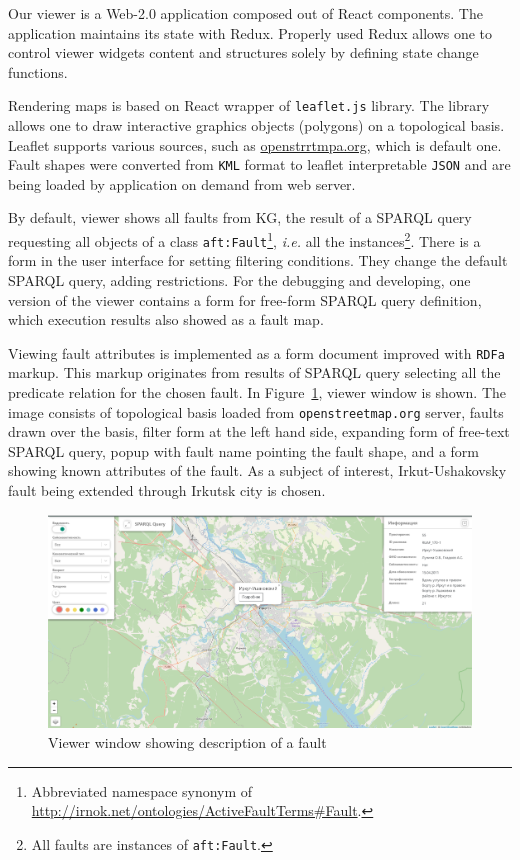 \documentclass[
]{ceurart}
\begin{document}
Our viewer is a Web-2.0 application composed out of React components.  The application maintains its state with Redux. Properly used Redux allows one to control viewer widgets content and structures solely by defining state change functions.

Rendering maps is based on React wrapper of \texttt{leaflet.js} library.  The library allows one to draw interactive graphics objects (polygons) on a topological basis.  Leaflet supports various sources, such as \href{https://openstreetmap.org/}{openstrrtmpa.org}, which is default one.  Fault shapes were converted from \texttt{KML} format to leaflet interpretable \texttt{JSON} and are being loaded by application on demand from web server.

By default, viewer shows all faults from KG, the result of a SPARQL query requesting all objects of a class \texttt{aft:Fault}\footnote{Abbreviated namespace synonym of \url{http://irnok.net/ontologies/ActiveFaultTerms\#Fault}.}, \emph{i.e.} all the instances\footnote{All faults are instances of \texttt{aft:Fault}.}.  There is a form in the user interface for setting filtering conditions.  They change the default SPARQL query, adding restrictions.  For the debugging and developing, one version of the viewer contains a form for free-form SPARQL query definition, which execution results also showed as a fault map.

Viewing fault attributes is implemented as a form document improved with \texttt{RDFa} markup.  This markup originates from results of SPARQL query selecting all the predicate relation for the chosen fault.
%
%
In Figure~\ref{fig:ex}, viewer window is shown.  The image consists of topological basis loaded from \texttt{openstreetmap.org} server, faults drawn over the basis, filter form at the left hand side, expanding form of free-text SPARQL query, popup with fault name pointing the fault shape, and a form showing known attributes of the fault.  As a subject of interest, Irkut-Ushakovsky fault being extended through Irkutsk city is chosen.

\begin{figure}
  \centering
  \includegraphics[width=\linewidth]{faults-leaflet-doc.png}
  \caption{Viewer window showing description of a fault}
  \label{fig:ex}
\end{figure}
\end{document}
